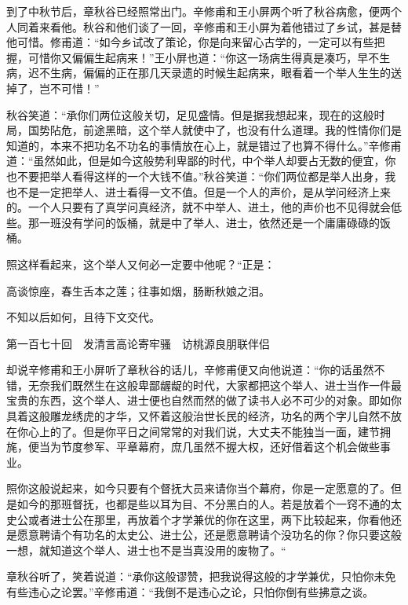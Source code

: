 \documentclass[12pt,UTF8]{ctexbook}
\begin{document}
{{{到了中秋节后，章秋谷已经照常出门。辛修甫和王小屏两个听了秋谷病愈，便两个人同着来看他。秋谷和他们谈了一回，辛修甫和王小屏为着他错过了乡试，甚是替他可惜。修甫道：“如今乡试改了策论，你是向来留心古学的，一定可以有些把握，可惜你又偏偏生起病来！”王小屏也道：“你这一场病生得真是凑巧，早不生病，迟不生病，偏偏的正在那几天录遗的时候生起病来，眼看着一个举人生生的送掉了，岂不可惜！”

秋谷笑道：“承你们两位这般关切，足见盛情。但是据我想起来，现在的这般时局，国势阽危，前途黑暗，这个举人就使中了，也没有什么道理。我的性情你们是知道的，本来不把功名不功名的事情放在心上，就是错过了也算不得什么。”辛修甫道：“虽然如此，但是如今这般势利卑鄙的时代，中个举人却要占无数的便宜，你也不要把举人看得这样的一个大钱不值。”秋谷笑道：“你们两位都是举人出身，我也不是一定把举人、进士看得一文不值。但是一个人的声价，是从学问经济上来的。一个人只要有了真学问真经济，就不中举人、进土，他的声价也不见得就会低些。那一班没有学问的饭桶，就是中了举人、进士，依然还是一个庸庸碌碌的饭桶。

照这样看起来，这个举人又何必一定要中他呢？“正是：

高谈惊座，春生舌本之莲；往事如烟，肠断秋娘之泪。

不知以后如何，且待下文交代。





第一百七十回　发清言高论寄牢骚　访桃源良朋联伴侣





却说辛修甫和王小屏听了章秋谷的话儿，辛修甫便又向他说道：“你的话虽然不错，无奈我们既然生在这般卑鄙龌龊的时代，大家都把这个举人、进士当作一件最宝贵的东西，这个举人、进士便也自然而然的做了读书人必不可少的对象。即如你具着这般雕龙绣虎的才华，又怀着这般治世长民的经济，功名的两个字儿自然不放在你心上的了。但是你平日之间常常的对我们说，大丈夫不能独当一面，建节拥旄，便当为节度参军、平章幕府，庶几虽然不握大权，还好借着这个机会做些事业。

照你这般说起来，如今只要有个督抚大员来请你当个幕府，你是一定愿意的了。但是如今的那班督抚，也都是些以耳为目、不分黑白的人。若是放着个一窍不通的太史公或者进士公在那里，再放着个才学兼优的你在这里，两下比较起来，你看他还是愿意聘请个有功名的太史公、进士公，还是愿意聘请个没功名的你？你只要这般一想，就知道这个举人、进士也不是当真没用的废物了。“

章秋谷听了，笑着说道：“承你这般谬赞，把我说得这般的才学兼优，只怕你未免有些违心之论罢。”辛修甫道：“我倒不是违心之论，只怕你倒有些拂意之谈。

}}}
\end{document}
